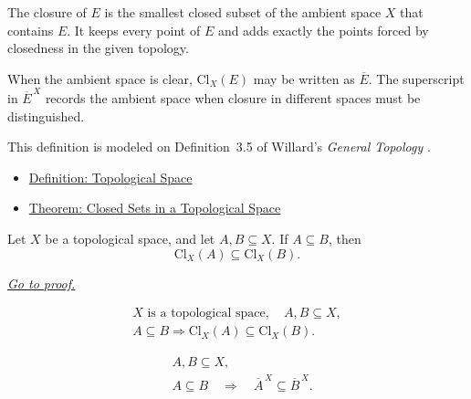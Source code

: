 \begin{remark*}[Interpretation]
The closure of \(E\) is the smallest closed subset of the ambient space \(X\)
that contains \(E\).  It keeps every point of \(E\) and adds exactly the points
forced by closedness in the given topology.
\end{remark*}

\begin{remark*}[Notation]
When the ambient space is clear, \(\mathrm{Cl}_{X}(E)\) may be written
as \(\overline{E}\).  The superscript in \(\overline{E}^{\,X}\) records the
ambient space when closure in different spaces must be distinguished.
\end{remark*}

\begin{remark*}
This definition is modeled on Definition~3.5 of Willard's
\emph{General Topology} \cite{WillardGeneralTopology}.
\end{remark*}

\begin{dependencies}
\begin{itemize}
  \item \hyperref[def:topological-space]{Definition: Topological Space}
  \item \hyperref[thm:closed-sets-in-topological-space]{Theorem: Closed Sets in a Topological Space}
\end{itemize}
\end{dependencies}

\begin{lemma}
\label{lem:topological-closure-monotone}
Let \(X\) be a topological space, and let \(A,B\subseteq X\).  If
\(A\subseteq B\), then
\[
\mathrm{Cl}_{X}(A)\subseteq\mathrm{Cl}_{X}(B).
\]

\smallskip
\noindent
\hyperref[prf:topological-closure-monotone]{\textit{Go to proof.}}
\end{lemma}

\begin{remark*}
\[
\begin{gathered}
X\text{ is a topological space},\quad A,B\subseteq X,\\
A\subseteq B
\Longrightarrow
\mathrm{Cl}_{X}(A)\subseteq\mathrm{Cl}_{X}(B).
\end{gathered}
\]
\end{remark*}

\begin{remark*}
\[
\begin{aligned}
&A,B\subseteq X,\\
&A\subseteq B
\quad\Longrightarrow\quad
\overline{A}^{\,X}\subseteq\overline{B}^{\,X}.
\end{aligned}
\]
\end{remark*}

